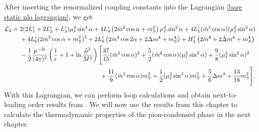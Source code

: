 After inserting the renormalized coupling constants into the Lagrangian \autoref{bare static nlo lagrangian},  we get
%
\begin{align}
    \label{nlo static lagrangian}
    \nonumber
    \mathcal{L}_4
    = {}&
    2(2L_1^r + 2L_2^r + L_3^r) \mu_I^4 \sin^4\alpha
    + 4  L_4^r \left( 2 \bar m^2 \cos\alpha + m_S^2 \right) \mu_I^2\sin^2\alpha
    + 4 L_5^r (\bar m^2 \cos\alpha) (\mu_I^2  \sin^2 \alpha )
    \\ \nonumber
    & 
    + 4 L_6^r (2\bar m^2\cos\alpha + m_S^2)^2
    + 2 L_8^r \left(2 \bar m^4 \cos2\alpha + 2 \Delta m^4 + m_S^4\right)
    + H_2^r \left(2\bar m^4 + 2\Delta m^4 + m_S^4 \right)
    \\ \nonumber
    &
    - \frac{1}{2}\frac{\mu^{-2\epsilon}}{(4\pi)^2}
    \left( \frac{1}{\epsilon} + 1 + \ln\frac{\tilde \mu^2}{M^2} \right)
    \Bigg[
        \frac{37}{15} (\bar m^2 \cos\alpha)^2
        +\frac{5}{2} (\bar m^2 \cos\alpha)(\mu_I^2\sin^2\alpha)
        +\frac{9}{8} (\mu_I^2\sin^2\alpha)^2 \\
        &
        \quad\quad\quad\quad\quad\quad\quad\quad\quad\quad\quad\quad\quad
        +\frac{11}{9} (\bar m^2 \cos\alpha)m_S^2
        +\frac{1}{2} (\mu_I^2\sin^2\alpha)m_S^2
        +\frac{5}{6} \Delta m^4
        +\frac{13}{18} m_S^2
    \Bigg].
\end{align}
%
With this Lagrangian, we can perform loop calculations and obtain next-to-leading order results from \chpt.
We will now use the results from this chapter to calculate the thermodynamic properties of the pion-condensed phase in the next chapter.

